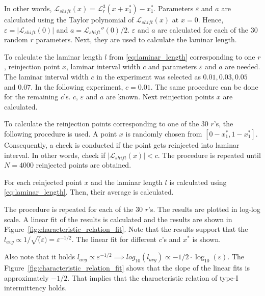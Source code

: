 In other words, $\mathcal{L}_{shift}(x) = \mathcal{L}_{r}^{3}(x + x^{*}_{1}) - x^{*}_{1}$.
Parameters $\varepsilon$ and $a$ are calculated using the Taylor polynomial of $\mathcal{L}_{shift}(x)$ at $x = 0$.
Hence, $\varepsilon = | \mathcal{L}_{shift}(0) |$ and $a = \mathcal{L}_{shift}''(0) / 2$.
$\varepsilon$ and $a$ are calculated for each of the $30$ random $r$ parameters.
Next, they are used to calculate the laminar length.
\par
To calculate the laminar length $l$ from \eqref{eq:laminar_length} corresponding to one $r$, reinjection point $x$, laminar interval width $c$ and parameters $\varepsilon$ and $a$ are needed.
The laminar interval width $c$ in the experiment was selected as $0.01, 0.03, 0.05$ and $0.07$.
In the following experiment, $c = 0.01$.
The same procedure can be done for the remaining $c$'s.
$c$, $\varepsilon$ and $a$ are known.
Next reinjection points $x$ are calculated.
\par
To calculate the reinjection points corresponding to one of the $30$ $r$'s, the following procedure is used.
A point $x$ is randomly chosen from $[ 0-x^{*}_{1}, 1-x^{*}_{1} ]$.
Consequently, a check is conducted if the point gets reinjected into laminar interval.
In other words, check if $| \mathcal{L}_{shift}(x) | < c$.
The procedure is repeated until $N = 4000$ reinjected points are obtained.
\par
For each reinjected point $x$ and the laminar length $l$ is calculated using \eqref{eq:laminar_length}.
Then, their average is calculated.
\par
The procedure is repeated for each of the $30$ $r$'s.
The results are plotted in log-log scale.
A linear fit of the results is calculated and the results are shown in Figure~\ref{fig:characteristic_relation_fit}.
Note that the results support that the $l_{avg} \propto 1/\sqrt(\varepsilon) = \varepsilon ^ {-1/2}$.
The linear fit for different $c$'s and $x^{*}$ is shown.
\par
Also note that it holds $l_{avg} \propto \varepsilon ^ {-1/2} \implies log_{10}(l_{avg}) \propto -1/2 \cdot \log_{10}(\varepsilon)$.
The Figure~\ref{fig:characteristic_relation_fit} shows that the slope of the linear fits is approximately $-1/2$.
That implies that the characteristic relation of type-I intermittency holds. 


